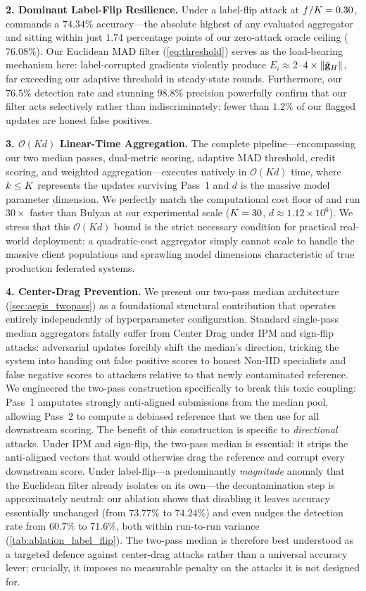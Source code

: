 \documentclass[../main.tex]{subfiles}
\begin{document}
\textbf{2. Dominant Label-Flip Resilience.}
Under a label-flip attack at $f/K = 0.30$, \aegis{} commands a $74.34\%$ accuracy---the absolute highest of any evaluated aggregator and sitting within just $1.74$ percentage points of our zero-attack oracle ceiling ($76.08\%$). Our Euclidean MAD filter (\cref{eq:threshold}) serves as the load-bearing mechanism here: label-corrupted gradients violently produce $E_i \approx 2$--$4\times \|\bar{\mathbf{g}}_{H}\|$, far exceeding our adaptive threshold in steady-state rounds. Furthermore, our $76.5\%$ detection rate and stunning $98.8\%$ precision powerfully confirm that our filter acts selectively rather than indiscriminately: fewer than $1.2\%$ of our flagged updates are honest false positives.

\textbf{3. $\mathcal{O}(Kd)$ Linear-Time Aggregation.}
The complete \aegis{} pipeline---encompassing our two median passes, dual-metric scoring, adaptive MAD threshold, credit scoring, and weighted aggregation---executes natively in $\mathcal{O}(Kd)$ time, where $k \leq K$ represents the updates surviving Pass~1 and $d$ is the massive model parameter dimension. We perfectly match the computational cost floor of \fedavg{} and run $30\times$ faster than Bulyan at our experimental scale ($K=30$, $d \approx 1.12 \times 10^6$). We stress that this $\mathcal{O}(Kd)$ bound is the strict necessary condition for practical real-world deployment: a quadratic-cost aggregator simply cannot scale to handle the massive client populations and sprawling model dimensions characteristic of true production federated systems.

\textbf{4. Center-Drag Prevention.}
We present our two-pass median architecture (\cref{sec:aegis_twopass}) as a foundational structural contribution that operates entirely independently of hyperparameter configuration. Standard single-pass median aggregators fatally suffer from Center Drag under IPM and sign-flip attacks: adversarial updates forcibly shift the median's direction, tricking the system into handing out false positive scores to honest Non-IID specialists and false negative scores to attackers relative to that newly contaminated reference. We engineered the two-pass construction specifically to break this toxic coupling: Pass~1 amputates strongly anti-aligned submissions from the median pool, allowing Pass~2 to compute a debiased reference that we then use for all downstream scoring. The benefit of this construction is specific to \emph{directional} attacks. Under IPM and sign-flip, the two-pass median is essential: it strips the anti-aligned vectors that would otherwise drag the reference and corrupt every downstream score. Under label-flip---a predominantly \emph{magnitude} anomaly that the Euclidean filter already isolates on its own---the decontamination step is approximately neutral: our ablation shows that disabling it leaves accuracy essentially unchanged (from $73.77\%$ to $74.24\%$) and even nudges the detection rate from $60.7\%$ to $71.6\%$, both within run-to-run variance (\cref{tab:ablation_label_flip}). The two-pass median is therefore best understood as a targeted defence against center-drag attacks rather than a universal accuracy lever; crucially, it imposes no measurable penalty on the attacks it is not designed for.
\end{document}
